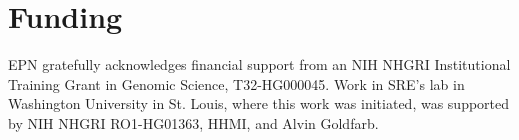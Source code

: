 \documentclass[11pt]{article}
\newif\ifdraft
\begin{document}
\section{Funding}
EPN gratefully acknowledges financial support from an NIH NHGRI
Institutional Training Grant in Genomic Science, T32-HG000045. Work in
SRE's lab in Washington University in St. Louis, where this work was
initiated, was supported by NIH NHGRI RO1-HG01363, HHMI, and Alvin
Goldfarb. 

\newpage
%


\ifdraft
 \relax
\else

\newpage


\newpage


\newpage


\newpage


\newpage


\newpage


\newpage


\newpage


\newpage


\newpage


\newpage

\fi
\end{document}
